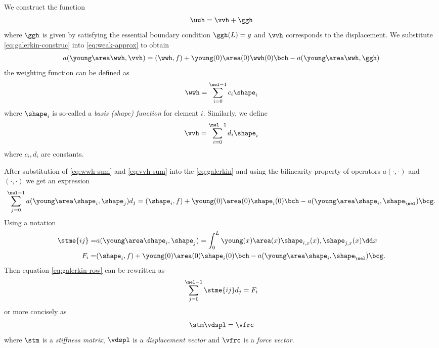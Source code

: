 \documentclass[twoside,a4paper,12pt]{article}
\begin{document}
We construct the function
\begin{align}
  \uuh  = \vvh + \ggh \label{eq:galerkin-construc}
\end{align}
%
where $\ggh$ is given by satisfying the essential boundary condition
$\ggh(L) = g$ and $\vvh$ corresponds to the displacement. We
substitute \eqref{eq:galerkin-construc} into \eqref{eq:weak-approx} to
obtain
%
\begin{align}
  a(\young\area\wwh,\vvh) = (\wwh, f) + \young(0)\area(0)\wwh(0)\bch - 
  a(\young\area\wwh,\ggh)\label{eq:galerkin}
\end{align}
%
the weighting function can be defined as
%
\begin{align}
  \wwh = \sum_{i=0}^{\nel-1} c_i \shape_i \label{eq:wwh-sum}
\end{align}
%
where $\shape_i$ is so-called a \emph{basis (shape) function} for
element $i$. Similarly, we define
%
\begin{align}
  \vvh = \sum_{i=0}^{\nel-1} d_i \shape_i \label{eq:vvh-sum}
\end{align}
where $c_i, d_i$ are constants.

After substitution of \eqref{eq:wwh-sum} and \eqref{eq:vvh-sum} into
the \eqref{eq:galerkin} and using the bilinearity property of
operators $a(\cdot,\cdot)$ and $(\cdot,\cdot)$ we get an expression
%
\begin{align}
  \sum_{j=0}^{\nel-1} a(\young\area\shape_i, \shape_j) d_j = (\shape_i, f) + \young(0)\area(0)\shape_i(0) \bch - a(\young\area\shape_i,\shape_\nel)\bcg. \label{eq:galerkin-row}
\end{align}
%
Using a notation
%
\begin{subequations}
  \begin{align}
    \stme{ij} =& a(\young\area\shape_i,\shape_j) = \int_0^L \young(x)\area(x)\shape_{i,x}(x),\shape_{j,x}(x) \dd x \label{eq:stme} \\ 
    F_i =& (\shape_i,f) + \young(0)\area(0)\shape_i(0) \bch - a(\young\area\shape_i,\shape_{\nel}) \bcg .
  \end{align}\label{eq:fem-stme-fi}
\end{subequations}
%
Then equation \eqref{eq:galerkin-row} can be rewritten as
%
\begin{align}
  \sum_{j=0}^{\nel-1} \stme{ij} d_j = F_i
\end{align}
or more concisely as
\begin{align}
\stm \vdspl = \vfrc \label{eq:concise-eq}
\end{align}
where $\stm$ is a \emph{stiffness matrix}, $\vdspl$ is a
\emph{displacement vector} and $\vfrc$ is a \emph{force vector}.
\end{document}
